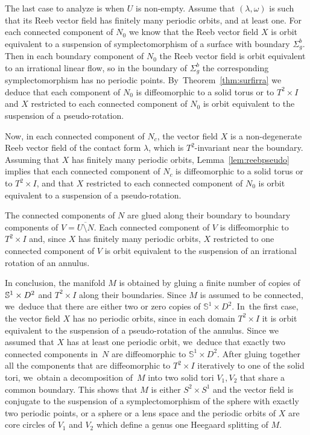 \documentclass[JEP,XML,SOM,Unicode,NoEqCountersInSection,NoFloatCountersInSection,published]{cedram}
\theoremstyle{definition}
\newcommand{\mS}{\mathbb{S}}
\begin{document}
The last case to analyze is when $U$ is non-empty. Assume that $(\lambda,\omega)$ is such that its Reeb vector field has finitely many periodic orbits, and at least one. For each connected component of $N_0$ we know that the Reeb vector field $X$ is orbit equivalent to a suspension of symplectomorphism of a surface with boundary $\Sigma_g^b$. Then in each boundary component of $N_0$ the Reeb vector field is orbit equivalent to an irrational linear flow, so in the boundary of $\Sigma_g^b$ the corresponding symplectomorphism has no periodic points. By~Theorem~\ref{thm:surfirra} we deduce that each component of $N_0$ is diffeomorphic to a solid torus or to $T^2\times I$ and $X$ restricted to each connected component of $N_0$ is orbit equivalent to the suspension of a pseudo-rotation.

Now, in each connected component of $N_c$, the vector field $X$ is a non-degenerate Reeb vector field of the contact form $\lambda$, which is $T^2$-invariant near the boundary.
Assuming that $X$ has finitely many periodic orbits, Lemma~\ref{lem:reebpseudo} implies that each connected component of $N_c$ is diffeomorphic to a solid torus or to $T^2\times I$, and that $X$ restricted to each connected component of $N_0$ is orbit equivalent to a suspension of a pseudo-rotation.

The connected components of $N$ are glued along their boundary to boundary components of $V=\overline{U\setminus N}$. Each connected component of $V$ is diffeomorphic to $T^2\times I$ and, since $X$ has finitely many periodic orbits, $X$ restricted to one connected component of $V$ is orbit equivalent to the suspension of an irrational rotation of an annulus.

In conclusion, the manifold $M$ is obtained by gluing a finite number of copies of $\mS^1\times\nobreak D^2$ and $T^2\times I$ along their boundaries. Since $M$ is assumed to be connected, we~deduce that there are either two or zero copies of $\mS^1\times D^2$. In~the first case, the vector field $X$ has no periodic orbits, since in each domain $T^2\times I$ it is orbit equivalent to the suspension of a pseudo-rotation of the annulus. Since we assumed that $X$ has at least one periodic orbit, we~deduce that exactly two connected components in~$N$ are diffeomorphic to $\mS^1\times D^2$. After gluing together all the components that are diffeomorphic to $T^2\times I$ iteratively to one of the solid tori, we~obtain a decomposition of~$M$ into two solid tori $V_1, V_2$ that share a common boundary. This shows that $M$ is either $S^2\times S^1$ and the vector field is conjugate to the suspension of a symplectomorphism of the sphere with exactly two periodic points, or a sphere or a lens space and the periodic orbits of $X$ are core circles of $V_1$ and $V_2$ which define a genus one Heegaard splitting of $M$.
\end{document}
